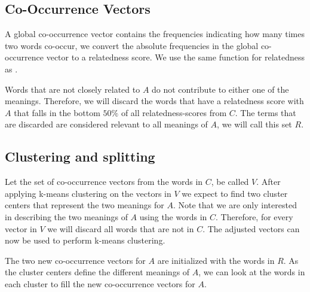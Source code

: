 \documentclass[11pt]{article}
\begin{document}
\subsection{Co-Occurrence Vectors}
A global co-occurrence vector contains the frequencies indicating how many times two words co-occur, we convert the absolute frequencies in the global co-occurrence vector to a relatedness score. We use the same function for relatedness as \cite{relatedness}.

Words that are not closely related to $A$ do not contribute to either one of the meanings. Therefore, we will discard the words that have a relatedness score with $A$ that falls in the bottom $50\%$ of all relatedness-scores from $C$. The terms that are discarded are considered relevant to all meanings of $A$, we will call this set $R$.

\subsection{Clustering and splitting}
Let the set of co-occurrence vectors from the words in $C$, be called $V$. After applying k-means clustering on the vectors in $V$ we expect to find two cluster centers that represent the two meanings for $A$. Note that we are only interested in describing the two meanings of $A$ using the words in $C$. Therefore, for every vector in $V$ we will discard all words that are not in $C$. The adjusted vectors can now be used to perform k-means clustering. 

The two new co-occurrence vectors for $A$ are initialized with the words in $R$. As the cluster centers define the different meanings of $A$, we can look at the words in each cluster to fill the new co-occurrence vectors for $A$.  
\end{document}
